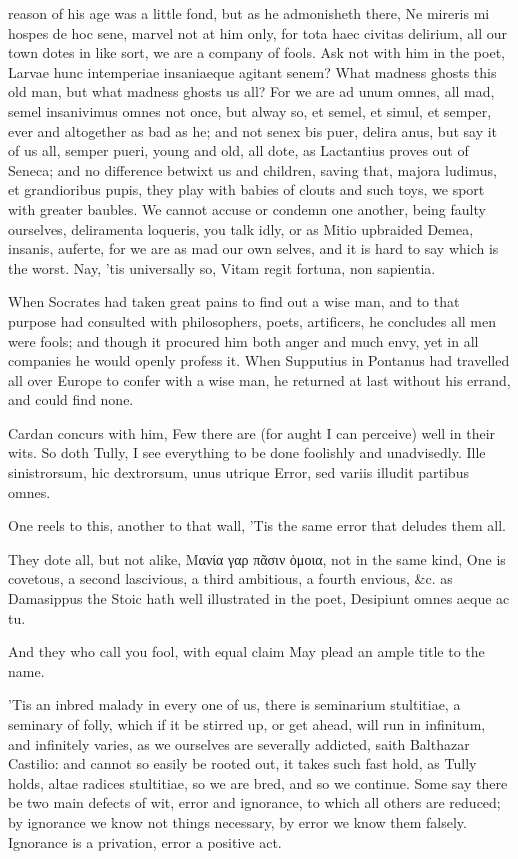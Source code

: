 {reason of his age was a little fond, but as he admonisheth there, Ne
mireris mi hospes de hoc sene, marvel not at him only, for tota haec
civitas delirium, all our town dotes in like sort, we are a
company of fools. Ask not with him in the poet, Larvae hunc
intemperiae insaniaeque agitant senem? What madness ghosts this old
man, but what madness ghosts us all? For we are ad unum omnes, all mad,
semel insanivimus omnes not once, but alway so, et semel, et simul, et
semper, ever and altogether as bad as he; and not senex bis puer,
delira anus, but say it of us all, semper pueri, young and old, all
dote, as Lactantius proves out of Seneca; and no difference betwixt us
and children, saving that, majora ludimus, et grandioribus pupis, they
play with babies of clouts and such toys, we sport with greater
baubles. We cannot accuse or condemn one another, being faulty
ourselves, deliramenta loqueris, you talk idly, or as Mitio
upbraided Demea, insanis, auferte, for we are as mad our own selves,
and it is hard to say which is the worst. Nay, 'tis universally so,
Vitam regit fortuna, non sapientia.

When Socrates had taken great pains to find out a wise man, and to
that purpose had consulted with philosophers, poets, artificers, he
concludes all men were fools; and though it procured him both anger and
much envy, yet in all companies he would openly profess it. When 
Supputius in Pontanus had travelled all over Europe to confer with a
wise man, he returned at last without his errand, and could find none.

 Cardan concurs with him, Few there are (for aught I can perceive)
well in their wits. So doth Tully, I see everything to be done
foolishly and unadvisedly.
Ille sinistrorsum, hic dextrorsum, unus utrique
Error, sed variis illudit partibus omnes.

One reels to this, another to that wall,
'Tis the same error that deludes them all.

They dote all, but not alike, Μανία γαρ πᾶσιν ὁμοια, not in the
same kind, One is covetous, a second lascivious, a third ambitious, a
fourth envious, \&c. as Damasippus the Stoic hath well illustrated in
the poet,
Desipiunt omnes aeque ac tu.

And they who call you fool, with equal claim
May plead an ample title to the name.

'Tis an inbred malady in every one of us, there is seminarium
stultitiae, a seminary of folly, which if it be stirred up, or get
ahead, will run in infinitum, and infinitely varies, as we ourselves
are severally addicted, saith Balthazar Castilio: and cannot so
easily be rooted out, it takes such fast hold, as Tully holds, altae
radices stultitiae, so we are bred, and so we continue. Some say
there be two main defects of wit, error and ignorance, to which all
others are reduced; by ignorance we know not things necessary, by error
we know them falsely. Ignorance is a privation, error a positive act.

}
